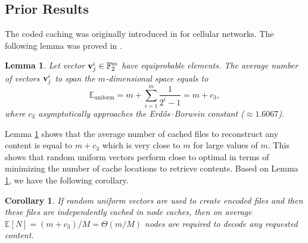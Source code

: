 \documentclass[10pt,journal]{IEEEtran}
\newtheorem{lem}{Lemma}
\newtheorem{corol}{Corollary}
\begin{document}
\subsection{Prior Results}
\label{prior_sec}
The coded caching was originally introduced in \cite{kiskani2016capacity,DBLP:journals/twc/KiskaniS17} for cellular networks. The following lemma was proved in \cite{kiskani2016capacity,DBLP:journals/twc/KiskaniS17}.
 \begin{lem}
 {\em
 Let vector ${\bf v}^i_j \in \mathbb{F}_2^{m}$ {have} equiprobable elements. The average number of vectors ${\bf v}^i_j$ to span the $m$-dimensional space equals to
 \begin{equation}
    \mathbb{E}_{\textrm{uniform}} = m + \sum_{i=1}^{m} \frac{1}{2^{i}-1}  =  m + c_3,
    \label{eq_lem_res1}
 \end{equation}
 where $c_3$ asymptotically approaches the Erdős–Borwein constant 
 ($\approx 1.6067$).%
 }\label{lem_uniform}
\end{lem}
Lemma \ref{lem_uniform} shows that the average number of cached files to reconstruct any content is equal to $m+c_3$ which is very close to $m$ for large values of $m$. This shows that random uniform vectors  perform close to optimal in terms of minimizing the number of cache locations to retrieve contents. Based on Lemma \ref{lem_uniform}, we have the following corollary.
\begin{corol}{\em 
 If random uniform vectors are used to create encoded files and then these files are independently cached in node caches, then on average 
 $\mathbb{E}[N]=(m+c_3)/M = \Theta({m}/{M})$ nodes are required to decode any requested content.
 }\label{corol_uniform}
\end{corol}
\end{document}
